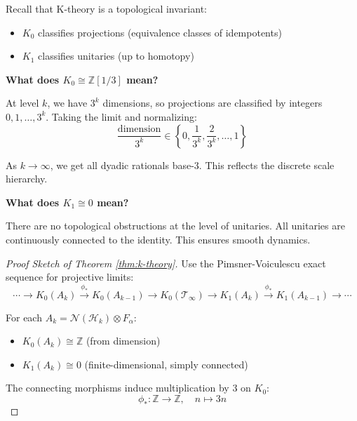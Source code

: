 \begin{defn}
\begin{level2}
Recall that K-theory is a topological invariant:
\begin{itemize}
\item $K_0$ classifies projections (equivalence classes of idempotents)
\item $K_1$ classifies unitaries (up to homotopy)
\end{itemize}

\textbf{What does $K_0 \cong \mathbb{Z}[1/3]$ mean?}

At level $k$, we have $3^k$ dimensions, so projections are classified by integers $0, 1, \ldots, 3^k$. Taking the limit and normalizing:
\begin{equation}
\frac{\text{dimension}}{3^k} \in \left\{0, \frac{1}{3^k}, \frac{2}{3^k}, \ldots, 1\right\}
\end{equation}

As $k \to \infty$, we get all dyadic rationals base-3. This reflects the discrete scale hierarchy.

\textbf{What does $K_1 \cong 0$ mean?}

There are no topological obstructions at the level of unitaries. All unitaries are continuously connected to the identity. This ensures smooth dynamics.
\end{level2}

\begin{proof}[Proof Sketch of Theorem \ref{thm:k-theory}]
Use the Pimsner-Voiculescu exact sequence for projective limits\cite{rordam_classification_2002}:
\begin{equation}
\cdots \to K_0(A_k) \xrightarrow{\phi_*} K_0(A_{k-1}) \to K_0(\mathcal{T}_\infty) \to K_1(A_k) \xrightarrow{\phi_*} K_1(A_{k-1}) \to \cdots
\end{equation}

For each $A_k = \mathcal{N}(\mathcal{H}_k) \otimes F_\alpha$:
\begin{itemize}
\item $K_0(A_k) \cong \mathbb{Z}$ (from dimension)
\item $K_1(A_k) \cong 0$ (finite-dimensional, simply connected)
\end{itemize}

The connecting morphisms induce multiplication by $3$ on $K_0$:
\begin{equation}
\phi_*: \mathbb{Z} \to \mathbb{Z}, \quad n \mapsto 3n
\end{equation}


\end{proof}
\end{defn}
